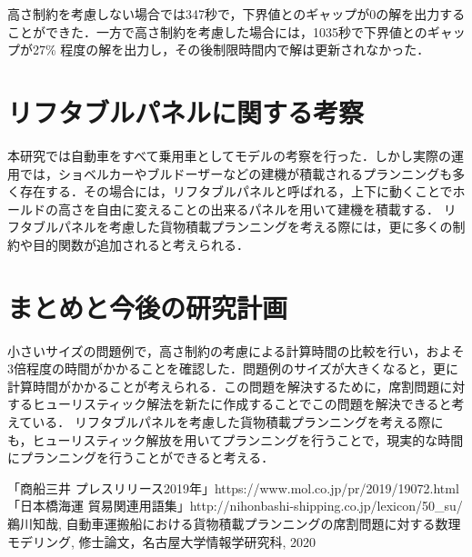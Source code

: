 \documentclass[a4j,11pt,twocolumn]{jsarticle}
\begin{document}
高さ制約を考慮しない場合では347秒で，下界値とのギャップが0の解を出力することができた．一方で高さ制約を考慮した場合には，1035秒で下界値とのギャップが27\% 程度の解を出力し，その後制限時間内で解は更新されなかった．

\section{リフタブルパネルに関する考察}
本研究では自動車をすべて乗用車としてモデルの考察を行った．しかし実際の運用では，ショベルカーやブルドーザーなどの建機が積載されるプランニングも多く存在する．その場合には，リフタブルパネルと呼ばれる，上下に動くことでホールドの高さを自由に変えることの出来るパネルを用いて建機を積載する．
リフタブルパネルを考慮した貨物積載プランニングを考える際には，更に多くの制約や目的関数が追加されると考えられる．


\section{まとめと今後の研究計画}
小さいサイズの問題例で，高さ制約の考慮による計算時間の比較を行い，およそ3倍程度の時間がかかることを確認した．問題例のサイズが大きくなると，更に計算時間がかかることが考えられる．この問題を解決するために，席割問題に対するヒューリスティック解法を新たに作成することでこの問題を解決できると考えている．
リフタブルパネルを考慮した貨物積載プランニングを考える際にも，ヒューリスティック解放を用いてプランニングを行うことで，現実的な時間にプランニングを行うことができると考える．
\begin{thebibliography}{2}
  「商船三井 プレスリリース2019年」https://www.mol.co.jp/pr/2019/19072.html
  「日本橋海運 貿易関連用語集」http://nihonbashi-shipping.co.jp/lexicon/50\_su/
 鵜川知哉, 自動車運搬船における貨物積載プランニングの席割問題に対する数理モデリング, 修士論文，名古屋大学情報学研究科, 2020
\end{thebibliography}
\end{document}
